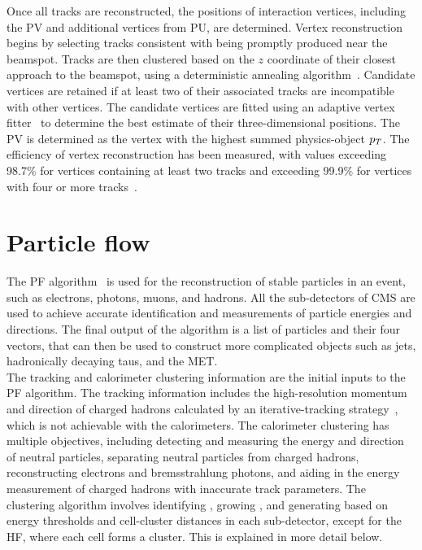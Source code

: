 Once all tracks are reconstructed, the positions of interaction vertices, including the \ac{PV} and additional vertices from \ac{PU}, are determined. 
Vertex reconstruction begins by selecting tracks consistent with being promptly produced near the beamspot. 
Tracks are then clustered based on the $z$ coordinate of their closest approach to the beamspot, using a deterministic annealing algorithm~\cite{Rose:1998dzq}. 
Candidate vertices are retained if at least two of their associated tracks are incompatible with other vertices. 
The candidate vertices are fitted using an adaptive vertex fitter~\cite{Fruhwirth:2007hz} to determine the best estimate of their three-dimensional positions. 
The \ac{PV} is determined as the vertex with the highest summed physics-object $p_{T}$.
The efficiency of vertex reconstruction has been measured, with values exceeding 98.7\% for vertices containing at least two tracks and exceeding 99.9\% for vertices with four or more tracks~\cite{CMS:2010mua}. 

\section{Particle flow}

The \ac{PF} algorithm~\cite{PF_CMS,CMS:2010byl,CMS:2010eua} is used for the reconstruction of stable particles in an event, such as electrons, photons, muons, and hadrons. 
All the sub-detectors of \ac{CMS} are used to achieve accurate identification and measurements of particle energies and directions. 
The final output of the algorithm is a list of particles and their four vectors, that can then be used to construct more complicated objects such as jets, hadronically decaying taus, and the \ac{MET}.\\

The tracking and calorimeter clustering information are the initial inputs to the \ac{PF} algorithm.
The tracking information includes the high-resolution momentum and direction of charged hadrons calculated by an iterative-tracking strategy~\cite{Adam:934067}, which is not achievable with the calorimeters.
The calorimeter clustering has multiple objectives, including detecting and measuring the energy and direction of neutral particles, separating neutral particles from charged hadrons, reconstructing electrons and bremsstrahlung photons, and aiding in the energy measurement of charged hadrons with inaccurate track parameters. 
The clustering algorithm involves identifying , growing , and generating  based on energy thresholds and cell-cluster distances in each sub-detector, except for the \ac{HF}, where each cell forms a cluster.
This is explained in more detail below. \\

